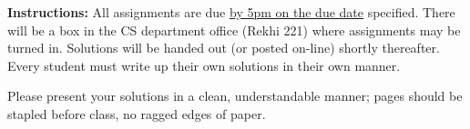 \documentclass[11pt,addpoints]{exam}
\begin{document}
\extrawidth{0.5in} \extrafootheight{-0in} \pagestyle{headandfoot}
\headrule {} \footrule {}

\noindent \textbf{Instructions:} All assignments are due \underline{by 5pm on the due date} specified.  There will be a box in the CS department office (Rekhi 221) where assignments may be turned in.  Solutions will be handed out (or posted on-line) shortly thereafter.  Every student
must write up their own solutions in their own manner.

\smallskip
\noindent Please present your solutions in a clean, understandable
manner; pages should be stapled before class, no ragged edges of
paper.

\hrulefill
\end{document}
